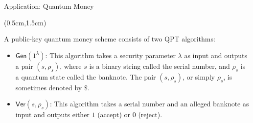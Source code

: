 \documentclass{beamer}
\theoremstyle{definition}
\newcommand{\gen}{\mathsf{Gen}}
\newcommand{\ver}{\mathsf{Ver}}
\begin{document}
        
            
    








\begin{frame}{Application: Quantum Money}
    
    \begin{textblock*}{12cm}(0.5cm,1.5cm)
            
        A public-key quantum money scheme consists of two QPT algorithms:
        \vspace{1cm} 
        \begin{itemize}
        \item $\gen(1^\lambda)$: This algorithm takes a security parameter $\lambda$ as input and outputs a pair $(s, \rho_s)$, where $s$ is a binary string called the serial number, and $\rho_s$ is a quantum state called the banknote. The pair $(s, \rho_s)$, or simply $\rho_s$, is sometimes denoted by $\$$.
        
        \vspace{1cm}
        \item $\ver(s, \rho_s)$: This algorithm takes a serial number and an alleged banknote as input and outputs either $1$ (accept) or $0$ (reject).
        \end{itemize}

    \end{textblock*}


\end{frame}
\end{document}
